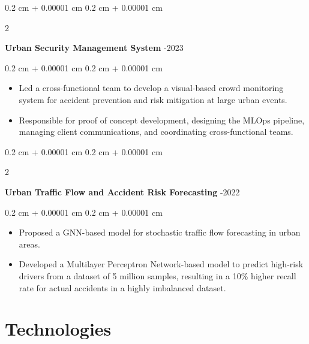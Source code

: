 \documentclass[10pt, letterpaper]{article}
\newenvironment{highlights}{
    \begin{itemize}[
        topsep=0.10 cm,
        parsep=0.10 cm,
        partopsep=0pt,
        itemsep=0pt,
        leftmargin=0.4 cm + 10pt
    ]
}{
    \end{itemize}
} %
\newenvironment{onecolentry}{
    \begin{adjustwidth}{
        0.2 cm + 0.00001 cm
    }{
        0.2 cm + 0.00001 cm
    }
}{
    \end{adjustwidth}
} %
\newenvironment{twocolentry}[2][]{
    \onecolentry
    \def\secondColumn{#2}
    \setcolumnwidth{\fill, 4.5 cm}
    \begin{paracol}{2}
}{
    \switchcolumn \raggedleft \secondColumn
    \end{paracol}
    \endonecolentry
} %
\begin{document}
        \vspace{0.2 cm}

        \begin{twocolentry}{
            2022-2023
        }
            \textbf{Urban Security Management System}\end{twocolentry}

        \vspace{0.10 cm}
        \begin{onecolentry}
            \begin{highlights}
                \item Led a cross-functional team to develop a visual-based crowd monitoring system for accident prevention and risk mitigation at large urban events.
                \item Responsible for proof of concept development, designing the MLOps pipeline, managing client communications, and coordinating cross-functional teams.
            \end{highlights}
        \end{onecolentry}


        \vspace{0.2 cm}

        \begin{twocolentry}{
            2021-2022
        }
            \textbf{Urban Traffic Flow and Accident Risk Forecasting}\end{twocolentry}

        \vspace{0.10 cm}
        \begin{onecolentry}
            \begin{highlights}
                \item Proposed a GNN-based model for stochastic traffic flow forecasting in urban areas.
                \item Developed a Multilayer Perceptron Network-based model to predict high-risk drivers from a dataset of 5 million samples, resulting in a 10\% higher recall rate for actual accidents in a highly imbalanced dataset.
            \end{highlights}
        \end{onecolentry}



    
    \section{Technologies}
\end{document}

